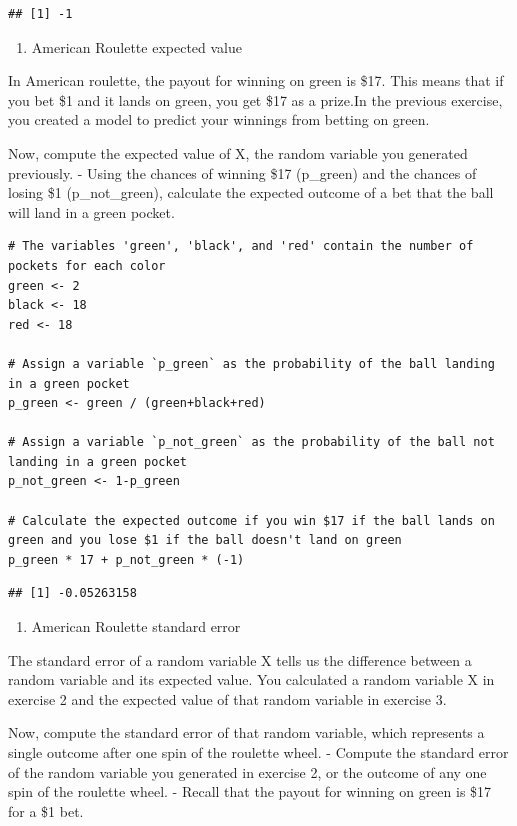 \documentclass[
]{article}
\providecommand{\tightlist}{%
  \setlength{\itemsep}{0pt}\setlength{\parskip}{0pt}}
\begin{document}
\begin{verbatim}
## [1] -1
\end{verbatim}

\begin{enumerate}
\def\labelenumi{\arabic{enumi}.}
\setcounter{enumi}{2}
\tightlist
\item
  American Roulette expected value
\end{enumerate}

In American roulette, the payout for winning on green is \$17. This
means that if you bet \$1 and it lands on green, you get \$17 as a
prize.In the previous exercise, you created a model to predict your
winnings from betting on green.

Now, compute the expected value of X, the random variable you generated
previously. - Using the chances of winning \$17 (p\_green) and the
chances of losing \$1 (p\_not\_green), calculate the expected outcome of
a bet that the ball will land in a green pocket.

\begin{verbatim}
# The variables 'green', 'black', and 'red' contain the number of pockets for each color
green <- 2
black <- 18
red <- 18

# Assign a variable `p_green` as the probability of the ball landing in a green pocket
p_green <- green / (green+black+red)

# Assign a variable `p_not_green` as the probability of the ball not landing in a green pocket
p_not_green <- 1-p_green

# Calculate the expected outcome if you win $17 if the ball lands on green and you lose $1 if the ball doesn't land on green
p_green * 17 + p_not_green * (-1)
\end{verbatim}

\begin{verbatim}
## [1] -0.05263158
\end{verbatim}

\begin{enumerate}
\def\labelenumi{\arabic{enumi}.}
\setcounter{enumi}{3}
\tightlist
\item
  American Roulette standard error
\end{enumerate}

The standard error of a random variable X tells us the difference
between a random variable and its expected value. You calculated a
random variable X in exercise 2 and the expected value of that random
variable in exercise 3.

Now, compute the standard error of that random variable, which
represents a single outcome after one spin of the roulette wheel. -
Compute the standard error of the random variable you generated in
exercise 2, or the outcome of any one spin of the roulette wheel. -
Recall that the payout for winning on green is \$17 for a \$1 bet.
\end{document}
